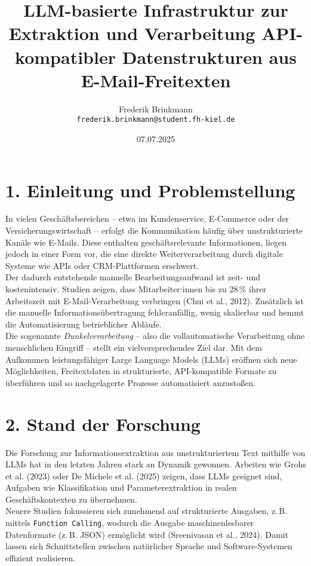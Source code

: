 \documentclass[12pt,a4paper]{scrartcl}
\title{LLM-basierte Infrastruktur zur Extraktion und Verarbeitung API-kompatibler Datenstrukturen aus E-Mail-Freitexten}
\author{Frederik Brinkmann \\ \texttt{frederik.brinkmann@student.fh-kiel.de}}
\date{07.07.2025}
\begin{document}
\maketitle

\section*{1. Einleitung und Problemstellung}

In vielen Geschäftsbereichen – etwa im Kundenservice, E-Commerce oder der Versicherungswirtschaft – erfolgt die Kommunikation häufig über unstrukturierte Kanäle wie E-Mails. Diese enthalten geschäftsrelevante Informationen, liegen jedoch in einer Form vor, die eine direkte Weiterverarbeitung durch digitale Systeme wie APIs oder CRM-Plattformen erschwert.\\

Der dadurch entstehende manuelle Bearbeitungsaufwand ist zeit- und kostenintensiv. Studien zeigen, dass Mitarbeiter:innen bis zu 28\,\% ihrer Arbeitszeit mit E-Mail-Verarbeitung verbringen (Chui et al., 2012). Zusätzlich ist die manuelle Informationsübertragung fehleranfällig, wenig skalierbar und hemmt die Automatisierung betrieblicher Abläufe.\\

Die sogenannte \emph{Dunkelverarbeitung} – also die vollautomatische Verarbeitung ohne menschlichen Eingriff – stellt ein vielversprechendes Ziel dar. Mit dem Aufkommen leistungsfähiger Large Language Models (LLMs) eröffnen sich neue Möglichkeiten, Freitextdaten in strukturierte, API-kompatible Formate zu überführen und so nachgelagerte Prozesse automatisiert anzustoßen.

\section*{2. Stand der Forschung}

Die Forschung zur Informationsextraktion aus unstrukturiertem Text mithilfe von LLMs hat in den letzten Jahren stark an Dynamik gewonnen. Arbeiten wie Grohs et al. (2023) oder De Michele et al. (2025) zeigen, dass LLMs geeignet sind, Aufgaben wie Klassifikation und Parameterextraktion in realen Geschäftskontexten zu übernehmen.\\

Neuere Studien fokussieren sich zunehmend auf strukturierte Ausgaben, z.\,B. mittels \texttt{Function Calling}, wodurch die Ausgabe maschinenlesbarer Datenformate (z.\,B. JSON) ermöglicht wird (Sreenivasan et al., 2024). Damit lassen sich Schnittstellen zwischen natürlicher Sprache und Software-Systemen effizient realisieren.
\end{document}
